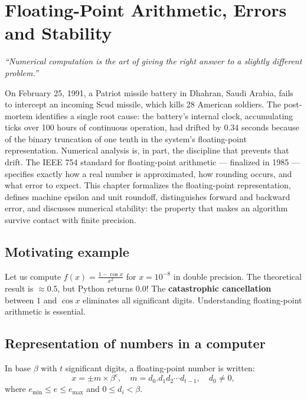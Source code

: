 \chapter{Floating-Point Arithmetic, Errors and Stability}
\label{ch:floating}

\begin{center}
\textit{``Numerical computation is the art of giving the right answer to a slightly different problem.''}
\end{center}

On February 25, 1991, a Patriot missile battery in Dhahran, Saudi Arabia, fails to intercept an incoming Scud missile, which kills 28 American soldiers. The post-mortem identifies a single root cause: the battery's internal clock, accumulating ticks over 100 hours of continuous operation, had drifted by 0.34 seconds because of the binary truncation of one tenth in the system's floating-point representation. Numerical analysis is, in part, the discipline that prevents that drift. The IEEE 754 standard for floating-point arithmetic --- finalized in 1985 --- specifies exactly how a real number is approximated, how rounding occurs, and what error to expect. This chapter formalizes the floating-point representation, defines machine epsilon and unit roundoff, distinguishes forward and backward error, and discusses numerical stability: the property that makes an algorithm survive contact with finite precision.

\section{Motivating example}

Let us compute $f(x)=\frac{1-\cos x}{x^2}$ for $x=10^{-8}$ in double precision. The theoretical result is $\approx 0.5$, but Python returns $0.0$! The \textbf{catastrophic cancellation} between $1$ and $\cos x$ eliminates all significant digits. Understanding floating-point arithmetic is essential.

\section{Representation of numbers in a computer}

\begin{definition}
In base $\beta$ with $t$ significant digits, a floating-point number is written:
\[
x = \pm m \times \beta^e, \quad m = d_0.d_1d_2\cdots d_{t-1}, \quad d_0\neq 0,
\]
where $e_{\min}\leq e\leq e_{\max}$ and $0\leq d_i<\beta$.
\end{definition}

